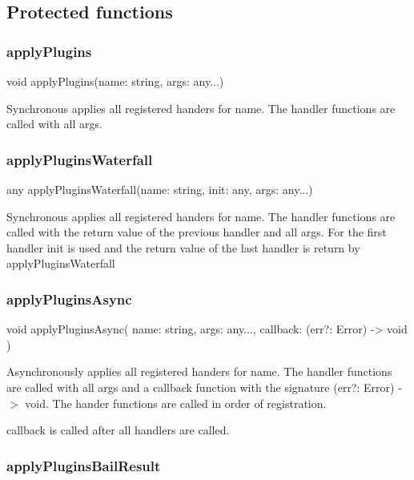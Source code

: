 \subsection*{Protected functions}

\subsubsection*{apply\+Plugins}


\begin{DoxyCode}
void applyPlugins(name: string, args: any...)
\end{DoxyCode}


Synchronous applies all registered handers for {\ttfamily name}. The handler functions are called with all args.

\subsubsection*{apply\+Plugins\+Waterfall}


\begin{DoxyCode}
any applyPluginsWaterfall(name: string, init: any, args: any...)
\end{DoxyCode}


Synchronous applies all registered handers for {\ttfamily name}. The handler functions are called with the return value of the previous handler and all args. For the first handler {\ttfamily init} is used and the return value of the last handler is return by {\ttfamily apply\+Plugins\+Waterfall}

\subsubsection*{apply\+Plugins\+Async}


\begin{DoxyCode}
void applyPluginsAsync(
    name: string,
    args: any...,
    callback: (err?: Error) -> void
)
\end{DoxyCode}


Asynchronously applies all registered handers for {\ttfamily name}. The handler functions are called with all args and a callback function with the signature {\ttfamily (err?\+: Error) -\/$>$ void}. The hander functions are called in order of registration.

{\ttfamily callback} is called after all handlers are called.

\subsubsection*{apply\+Plugins\+Bail\+Result}



